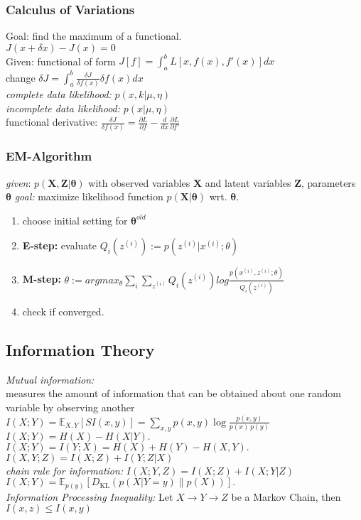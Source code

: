 \documentclass[9pt,parskip]{scrartcl}
\begin{document}
\begin{multicols*}{4}
\subsubsection*{Calculus of Variations}
Goal: find the maximum of a functional. \\
$J(x + \delta x) - J(x) = 0$ \\
Given: functional of form 
$J[f]=\int _{a}^{b} L[x,f(x),f'(x)] dx $ \\
change $\delta J = \int_a^b  \frac{\delta J}{\delta f(x)} \delta f(x) dx $ \\
\textit{complete data likelihood:} $p(x,k|\mu, \eta)$\\
\textit{incomplete data likelihood:} $p(x|\mu, \eta)$\\
functional derivative: $\frac{\delta J}{\delta f(x)} = \frac{\partial L}{\partial f} -\frac{d}{dx} \frac{\partial L}{\partial f'} $
\subsubsection*{EM-Algorithm}
\textit{given}: $p(\mathbf{X},\mathbf{Z}|\mathbf{\theta})$ with observed variables $\mathbf{X}$ and latent variables $\mathbf{Z}$, parameters $\mathbf{\theta}$
\textit{goal:} maximize likelihood function $p(\mathbf{X}|\mathbf{\theta})$ wrt. $\mathbf{\theta}$.
\begin{enumerate}
	\item choose initial setting for $\boldsymbol{\theta}^{old}$
	\item \textbf{E-step:} evaluate 
	$Q_i(z^{(i)}) := p(z^{(i)}|x^{(i)};\theta)$
	\item \textbf{M-step:} 
	$\theta := argmax_{\theta} \sum_i \sum_{z^{(i)}} Q_i(z^{(i)})log\frac{p(x^{(i)},z^{(i)};\theta)}{Q_i(z^{(i)})}$ 
	\item check if converged.
\end{enumerate}

\subsection*{Information Theory}
\textit{Mutual information: } \\
measures the amount of information that can be obtained about one random variable by observing another \\
$I(X;Y)=\mathbb {E} _{X,Y}[SI(x,y)]=\sum _{x,y}p(x,y)\log {\frac {p(x,y)}{p(x)\,p(y)}}$ \\
$I(X;Y)=H(X)-H(X|Y).\,$ \\
$I(X;Y)=I(Y;X)=H(X)+H(Y)-H(X,Y).\,$ \\
$I(X,Y;Z) = I(X;Z) + I(Y;Z|X)$\\
\textit{chain rule for information: }$I(X;Y,Z)=I(X;Z)+I(X;Y|Z)$ \\
$I(X;Y)=\mathbb {E} _{p(y)}[D_{\mathrm {KL} }(p(X|Y=y)\|p(X))].$ \\
\textit{Information Processing Inequality: } Let $X \rightarrow Y \rightarrow Z$ be a Markov Chain, then $I(x,z) \leq I(x,y)$

\end{multicols*}
\end{document}
